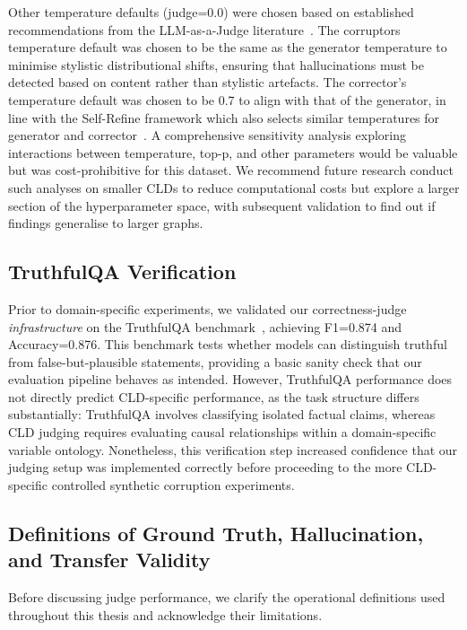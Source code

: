 Other temperature defaults (judge=0.0) were chosen based on established recommendations from the LLM-as-a-Judge literature~\citep{liu2023gevalnlgevaluationusing, zheng2024judging}.
The corruptors temperature default was chosen to be the same as the generator temperature to minimise stylistic distributional shifts, ensuring that hallucinations must be detected based on content rather than stylistic artefacts.
The corrector's temperature default was chosen to be 0.7 to align with that of the generator, in line with the Self-Refine framework which also selects similar temperatures for generator and corrector~\citep{madaan2023selfrefineiterativerefinementselffeedback}.
A comprehensive sensitivity analysis exploring interactions between temperature, top-p, and other parameters would be valuable but was cost-prohibitive for this dataset. We recommend future research conduct such analyses on smaller CLDs to reduce computational costs but explore a larger section of the hyperparameter space, with subsequent validation to find out if findings generalise to larger graphs.

\subsection{TruthfulQA Verification}

Prior to domain-specific experiments, we validated our correctness-judge \textit{infrastructure} on the TruthfulQA benchmark~\citep{lin2022truthfulqa}, achieving F1=0.874 and Accuracy=0.876. This benchmark tests whether models can distinguish truthful from false-but-plausible statements, providing a basic sanity check that our evaluation pipeline behaves as intended. However, TruthfulQA performance does not directly predict CLD-specific performance, as the task structure differs substantially: TruthfulQA involves classifying isolated factual claims, whereas CLD judging requires evaluating causal relationships within a domain-specific variable ontology. Nonetheless, this verification step increased confidence that our judging setup was implemented correctly before proceeding to the more CLD-specific controlled synthetic corruption experiments.

\subsection{Definitions of Ground Truth, Hallucination, and Transfer Validity}

Before discussing judge performance, we clarify the operational definitions used throughout this thesis and acknowledge their limitations.

